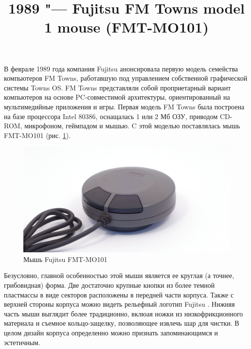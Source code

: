 \documentclass[11pt, a4paper]{article}
\begin{document}
\title{1989 "--- Fujitsu FM Towns model 1 mouse (FMT-MO101)}
\date{}
\maketitle
{}

В феврале 1989 года компания Fujitsu анонсировала первую модель семейства компьютеров FM Towns, работавшую под управлением собственной графической системы Towns OS. FM Towns представляли собой проприетарный вариант компьютеров на основе PC-совместимой архитектуры, ориентированный на мультимедийные приложения и игры. Первая модель FM Towns была построена на базе процессора Intel 80386, оснащалась 1 или 2 Мб ОЗУ, приводом CD-ROM, микрофоном, геймпадом и мышью. C этой моделью поставлялась мышь FMT-MO101 (рис. \ref{fig:FMT1Pic}).

\begin{figure}[h]
    \centering
    \includegraphics[scale=0.6]{1989_fujitsu_fmt_mo101_mouse/pic_30.jpg}
    \caption{Мышь Fujitsu FMT-MO101}
    \label{fig:FMT1Pic}
\end{figure}

Безусловно, главной особенностью этой мыши является ее круглая (а точнее, грибовидная) форма. Две достаточно крупные кнопки из более темной пластмассы в виде секторов расположены в передней части корпуса. Также с верхней стороны корпуса можно видеть рельефный логотип Fujitsu \cite{twinklemagic}. Нижняя часть мыши выглядит более традиционно, вклюая ножки из низкофрикционного материала и съемное кольцо-защелку, позволяющее извлечь шар для чистки. В целом дизайн корпуса определенно можно признать запоминающимся и эстетичным.
\end{document}

